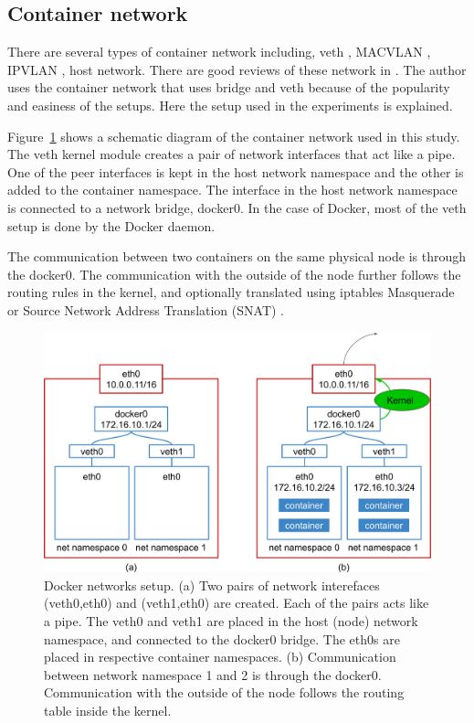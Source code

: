 \subsection{Container network}

There are several types of container network including, veth \cite{bhattiprolu2008virtual}, MACVLAN \cite{rathore2010performance}, IPVLAN \cite{ipvlan}, host network.
There are good reviews of these network in  \cite{Marmol2015,claassen2016linux,struye2017assessing}.
The author uses the container network that uses bridge and veth because of the popularity and easiness of the setups.
Here the setup used in the experiments is explained.

Figure~\ref{fig:bridge+veth} shows a schematic diagram of the container network used in this study.
The veth kernel module creates a pair of network interfaces that act like a pipe.
One of the peer interfaces is kept in the host network namespace and the other is added to the container namespace.
The interface in the host network namespace is connected to a network bridge, docker0.
In the case of Docker, most of the veth setup is done by the Docker daemon.

The communication between two containers on the same physical node is through the docker0.
The communication with the outside of the node further follows the routing rules in the kernel,
and optionally translated using iptables Masquerade or Source Network Address Translation (SNAT) \cite{MartinA.Brown2017}.

\begin{figure}[h]
  \centering
  \includegraphics[width=0.95\columnwidth]{Figs/bridge+veth}

  \par\bigskip
  \centering
  \begin{minipage}{0.9\columnwidth}
    \caption[Docker networks setup]{
      Docker networks setup.
      (a) Two pairs of network interefaces (veth0,eth0) and (veth1,eth0) are created.
      Each of the pairs acts like a pipe.
      The veth0 and veth1 are placed in the host (node) network namespace, and connected to the docker0 bridge.
      The eth0s are placed in respective container namespaces.
      (b) Communication between network namespace 1 and 2 is through the docker0.
      Communication with the outside of the node follows the routing table inside the kernel.
    }
    \label{fig:bridge+veth}
  \end{minipage}
\end{figure}
 
